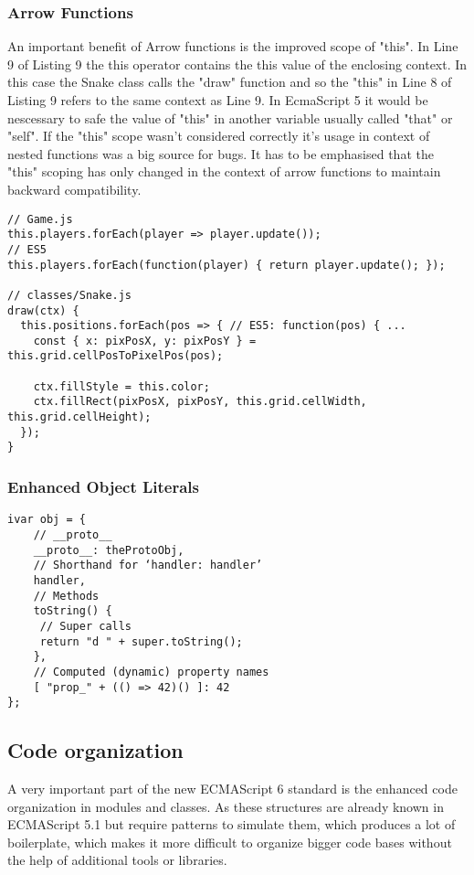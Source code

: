 \documentclass{bioinfo}
\begin{document}
\subsubsection{Arrow Functions}

An important benefit of Arrow functions is the improved scope of "this". In Line 9 of Listing 9 the this operator 
contains the this value of the enclosing context. In this case the Snake class calls the "draw" function and so 
the "this" in Line 8 of Listing 9 refers to the same context as Line 9. In EcmaScript 5 it would be nescessary to safe the
value of "this" in another variable usually called "that" or "self". If the "this" scope wasn't considered correctly it's usage
in context of nested functions was a big source for bugs. It has to be emphasised that the "this" scoping has only changed in the
context of arrow functions to maintain backward compatibility.

\begin{lstlisting}[caption= My Javascript Example]
// Game.js
this.players.forEach(player => player.update());
// ES5
this.players.forEach(function(player) { return player.update(); });

// classes/Snake.js
draw(ctx) {
  this.positions.forEach(pos => { // ES5: function(pos) { ...
    const { x: pixPosX, y: pixPosY } = this.grid.cellPosToPixelPos(pos);

    ctx.fillStyle = this.color;
    ctx.fillRect(pixPosX, pixPosY, this.grid.cellWidth, this.grid.cellHeight);
  });
}
\end{lstlisting}

\subsubsection{Enhanced Object Literals}

\begin{lstlisting}[caption= My Javascript Example]
ivar obj = {
    // __proto__
    __proto__: theProtoObj,
    // Shorthand for ‘handler: handler’
    handler,
    // Methods
    toString() {
     // Super calls
     return "d " + super.toString();
    },
    // Computed (dynamic) property names
    [ "prop_" + (() => 42)() ]: 42
};
\end{lstlisting}

\subsection{Code organization}
A very important part of the new ECMAScript 6 standard is the enhanced code organization in modules and classes. As these structures are already known
in ECMAScript 5.1 but require patterns to simulate them, which produces a lot of boilerplate, which makes it more difficult to organize bigger code bases
without the help of additional tools or libraries.
\end{document}

